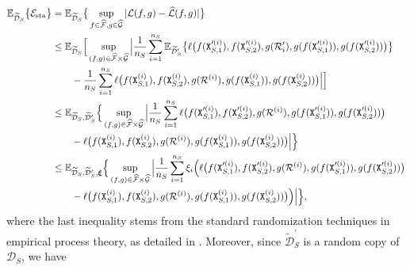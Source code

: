 \begin{align*}
    \mathbb{E}_{\widetilde{\mathcal{D}}_S}\big\{\mathcal{E}_{\mathrm{sta}}\big\} &= \mathbb{E}_{\widetilde{\mathcal{D}}_S}\big\{\sup_{f \in \widehat{\mathcal{F}}, g \in \widehat{\mathcal{G}}}\vert{\mathcal{L}(f, g) - \widehat{\mathcal{L}}(f, g)}\vert\big\} \\
    &\leq \mathbb{E}_{\widetilde{\mathcal{D}}_S}\Big[\sup_{(f, g) \in \widehat{\mathcal{F}} \times \widehat{\mathcal{G}}}\Big\vert\frac{1}{n_S}\sum_{i=1}^{n_S}\mathbb{E}_{\widetilde{\mathcal{D}}^\prime_S}\big\{\ell\big(f(\mathtt{X}_{S,1}^{\prime(i)}), f(\mathtt{X}_{S,2}^{\prime(i)}), g(\mathcal{R}^\prime_i), g(f(\mathtt{X}_{S,1}^{\prime(i)})), g(f(\mathtt{X}_{S,2}^{\prime(i)}))\big)\big\} \\
    &\qquad - \frac{1}{n_S}\sum_{i=1}^{n_S}\ell\big(f(\mathtt{X}_{S,1}^{(i)}), f(\mathtt{X}_{S,2}^{(i)}), g(\mathcal{R}^{(i)}), g(f(\mathtt{X}_{S,1}^{(i)})), g(f(\mathtt{X}_{S,2}^{(i)}))\big) \Big\vert\Big] \\
    &\leq \mathbb{E}_{\widetilde{\mathcal{D}}_S, \widetilde{\mathcal{D}}_S^\prime}\Big\{\sup_{(f, g) \in \widehat{\mathcal{F}} \times \widehat{\mathcal{G}}}\Big\vert\frac{1}{n_S}\sum_{i=1}^{n_S}\ell\big(f(\mathtt{X}_{S,1}^{\prime(i)}), f(\mathtt{X}_{S,2}^{\prime(i)}), g(\mathcal{R}^{(i)}), g(f(\mathtt{X}_{S,1}^{\prime(i)})), g(f(\mathtt{X}_{S,2}^{\prime(i)}))\big) \\
    &\qquad - \ell\big(f(\mathtt{X}_{S,1}^{(i)}), f(\mathtt{X}_{S,2}^{(i)}), g(\mathcal{R}^{(i)}), g(f(\mathtt{X}_{S,1}^{(i)})), g(f(\mathtt{X}_{S,2}^{(i)}))\big) \Big\vert\Big\} \\
    &\leq \mathbb{E}_{\widetilde{\mathcal{D}}_S, \widetilde{\mathcal{D}}_S^\prime, \bm{\xi}}\Big\{\sup_{(f, g) \in \widehat{\mathcal{F}} \times \widehat{\mathcal{G}}}\Big\vert\frac{1}{n_S}\sum_{i=1}^{n_S}\xi_i\Big(\ell\big(f(\mathtt{X}_{S,1}^{\prime(i)}), f(\mathtt{X}_{S,2}^{\prime(i)}), g(\mathcal{R}^{(i)}), g(f(\mathtt{X}_{S,1}^{\prime(i)})), g(f(\mathtt{X}_{S,2}^{\prime(i)}))\big) \\
    &\qquad - \ell\big(f(\mathtt{X}_{S,1}^{(i)}), f(\mathtt{X}_{S,2}^{(i)}), g(\mathcal{R}^{(i)}), g(f(\mathtt{X}_{S,1}^{(i)})), g(f(\mathtt{X}_{S,2}^{(i)}))\big)\Big)\Big\vert\Big\},
    \end{align*}
    where the last inequality stems from the standard randomization techniques in empirical process theory, as detailed in \citet{gine2016mathematical}. Moreover, since $\widetilde{\mathcal{D}}^\prime_S$ is a random copy of $\mathcal{D}_S$, we have
